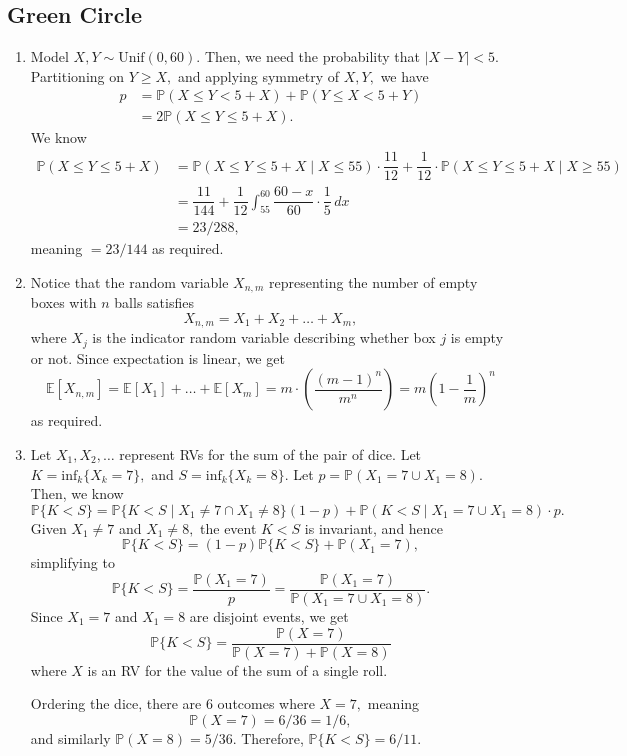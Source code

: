 \documentclass[12pt]{article}
\begin{document}
\subsection{Green Circle}
\begin{enumerate}
  \item[3] Model $X, Y \sim \text{Unif}(0, 60).$ Then, we need the
    probability that $|X - Y| < 5.$ Partitioning on $Y \geq X,$ and
    applying symmetry of $X, Y,$ we have
    \begin{align*}
      p &= \mathbb P(X \leq Y < 5 + X)  + \mathbb P(Y \leq X < 5 + Y)\\
      &= 2\mathbb P(X \le Y \leq 5 + X).
    \end{align*}
    We know
    \begin{align*}
      \mathbb P(X \leq Y \leq 5 + X) &= \mathbb P(X \leq Y \leq 5 + X
      \mid  X \leq 55) \cdot \dfrac{11}{12} + \dfrac{1}{12} \cdot
      \mathbb P(X \leq Y \leq 5 + X \mid X \geq 55) \\
      &= \dfrac{11}{144} + \dfrac{1}{12} \int_{55}^{60}
      \dfrac{60-x}{60} \cdot \dfrac{1}{5} \, dx \\
      &= 23/288,
    \end{align*}
    meaning $ = 23/144$ as required.

  \item[4]
    Notice that the random variable $X_{n, m}$ representing the
    number of empty boxes with $n$ balls satisfies $$
    X_{n, m} = X_{1} + X_2 + \ldots + X_{m},
    $$
    where $X_j$ is the indicator random variable describing whether
    box $j$ is empty or not. Since expectation is linear, we get
    $$
    \mathbb E[X_{n, m}] = \mathbb E[X_1] + \ldots + \mathbb E[X_m] =
    m \cdot \left (
      \dfrac{(m-1)^n}{m^n}
    \right) = m\left(1 - \dfrac{1}{m}\right)^{n}
    $$
    as required.

  \item[5] Let $X_1, X_2, \ldots$ represent RVs for the sum of the
    pair of dice. Let $K = \text{inf}_k\{X_k = 7\},$ and $S =
    \text{inf}_{k}\{X_k = 8\}.$ Let $p = \mathbb P(X_1 = 7 \cup X_1 =
    8).$ Then, we know
    $$
    \mathbb P\{K < S\} = \mathbb P\{ K < S \mid X_1 \neq 7 \cap X_1
    \neq 8\}(1-p) + \mathbb P(K < S \mid  X_1 = 7 \cup X_1 = 8) \cdot p.
    $$
    Given $X_1 \neq  7$ and $X_1 \neq 8,$ the event $K < S$ is
    invariant, and hence
    $$
    \mathbb P\{K < S\} = (1-p)\mathbb P\{K < S\} + \mathbb P(X_1 = 7),
    $$
    simplifying to
    $$
    \mathbb P\{K < S\} = \dfrac{\mathbb P(X_1 = 7)}{p} =
    \dfrac{\mathbb P(X_1 = 7)}{\mathbb P(X_1 = 7  \cup X_1 = 8)}.
    $$
    Since $X_1 = 7$ and $X_1 = 8$ are disjoint events, we get
    $$
    \mathbb P\{K < S\} = \dfrac{\mathbb P(X = 7)}{\mathbb P(X = 7 ) +
    \mathbb P(X = 8)}
    $$
    where $X$ is an RV for the value of the sum of a single roll.

    Ordering the dice, there are $6$ outcomes where $X = 7,$ meaning
    $$\mathbb P(X = 7) = 6/36 = 1 / 6,$$ and similarly $\mathbb P(X =
    8) = 5/36.$ Therefore, $\mathbb P \{K < S\} = 6/11.$
\end{enumerate}
\end{document}
